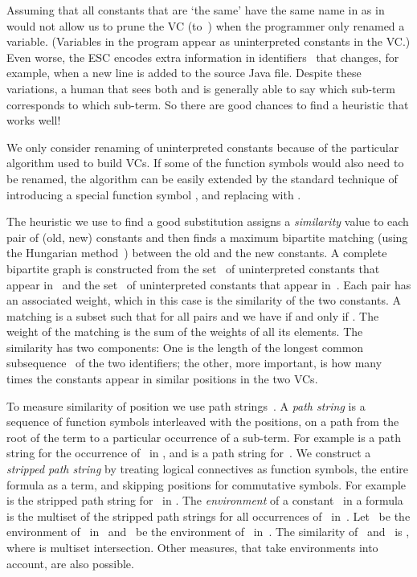 \documentclass{llncs}
\begin{document}
Assuming that all constants that are `the same' have the 
same name in  as in  would not allow us 
to prune the VC (to~) when the programmer only 
renamed a variable. (Variables in the program appear as
uninterpreted constants in the VC.) Even worse, the ESC encodes extra 
information in identifiers~\cite{leino2005get} that changes, 
for example, when a new line is added to the source Java file. 
Despite these variations, a human that sees both  and 
 is generally able to say which sub-term corresponds 
to which sub-term. So there are good chances to find a heuristic 
that works well!

We only consider renaming of uninterpreted constants because 
of the particular algorithm used to build VCs. If some of the 
function symbols would also need to be renamed, the algorithm 
can be easily extended by the standard technique of introducing 
a special function symbol , and replacing 
 with .

The heuristic we use to find a good substitution assigns 
a \emph{similarity} value to each pair of (old, new) constants 
and then finds a maximum bipartite matching (using the Hungarian
method~\cite{hungarian_alg}) between the old and
the new constants. A complete bipartite graph is 
constructed from the set~ of uninterpreted constants that appear
in~ and the set~ of uninterpreted constants that appear
in~. Each pair  
has an associated weight, which in this case is
the similarity of the two constants. A matching
is a subset  such that
for all pairs  and 
we have  if and only if .
The weight of the matching is the sum of the weights of all its elements.
The similarity has two components: One is the length of the longest
common subsequence~\cite{lcs} of the two identifiers; the other, more
important, is how many times the constants appear in similar positions
in the two VCs.  

To measure similarity of position we use path
strings~\cite{termIndexing}.  A \emph{path string} is a sequence of
function symbols interleaved with the positions, on a path from the
root of the term to a particular occurrence of a sub-term.  For example
 is a path string for the occurrence of~ in , and
 is a path string for~.  We construct a \emph{stripped path string}
by treating logical connectives as function symbols, the entire formula as
a term, and skipping positions for commutative symbols.
For example  is the stripped path string 
for~ in .
The \emph{environment} of a constant~ in a formula 
is the multiset of the stripped path strings for all occurrences 
of~ in~.  Let~ be the environment of~ in~ 
and~ be the environment of~ in~. The similarity
of~ and~ is ,
where  is multiset intersection.
Other measures, that take environments into account, are also possible.
\end{document}
